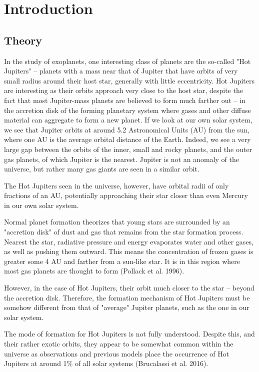 \documentclass[12pt]{article}
\begin{document}
\clearpage

\section{Introduction}

\subsection{Theory}

In the study of exoplanets, one interesting class of planets are the so-called "Hot Jupiters" -- planets with a mass near that of Jupiter 
that have orbits of very small radius around their host star, generally with little eccentricity.
Hot Jupiters are interesting as their orbits approach very close to the host star,
despite the fact that most Jupiter-mass planets are believed to form much farther
out -- in the accretion disk of the forming planetary system where gases 
and other diffuse material can aggregate to form a new planet. If we look at our own
solar system, we see that Jupiter orbits at around 5.2 Astronomical Units (AU) from the
sun, where one AU is the average orbital distance of the Earth. Indeed,
we see a very large gap between the orbits of the inner, small and rocky planets, and
the outer gas planets, of which Jupiter is the nearest. Jupiter is not an anomaly of
the universe, but rather many gas giants are seen in a similar orbit. %

The Hot Jupiters seen in the universe, however, have orbital 
radii of only fractions of an AU, potentially 
approaching their star closer than even Mercury in our own solar system. %

Normal planet formation theorizes that young stars are surrounded by an "accretion disk"
of dust and gas that remains from the star formation process. Nearest the star, radiative
pressure and energy evaporates water and other gases, as well as pushing them outward. 
This means the concentration of frozen gases
is greater some 4 AU and farther from a sun-like star. It is in this region where most
gas planets are thought to form (Pollack et al. 1996).

However, in the case of Hot Jupiters, their orbit much closer to the star --  
beyond the accretion disk. 
Therefore, the formation mechanism of Hot Jupiters
must be somehow different from that of "average" Jupiter planets, such as the one in our
solar system.

The mode of formation for Hot Jupiters is not fully understood.
Despite this, and their rather exotic orbits, 
they appear to be somewhat common within the universe as observations and previous models place the occurrence of Hot Jupiters at around 1\% of all solar systems (Brucalassi et al. 2016).  
\end{document}
